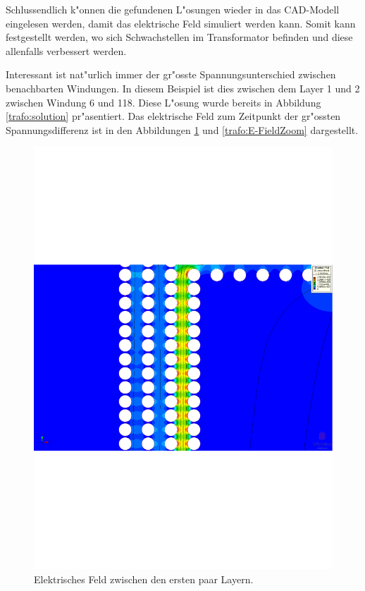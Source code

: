 \begin{refsection}
Schlussendlich k"onnen die gefundenen L"osungen wieder in das CAD-Modell eingelesen werden, damit das elektrische Feld simuliert werden kann. Somit kann festgestellt werden, wo sich Schwachstellen im Transformator befinden und diese allenfalls verbessert werden.

Interessant ist nat"urlich immer der gr"osste Spannungsunterschied zwischen benachbarten Windungen. In diesem Beispiel ist dies zwischen dem Layer 1 und 2 zwischen Windung 6 und 118.
Diese L"osung wurde bereits in Abbildung \ref{trafo:solution} pr"asentiert. Das elektrische Feld zum Zeitpunkt der gr"ossten Spannungsdifferenz ist in den Abbildungen \ref{trafo:E-Field} und \ref{trafo:E-FieldZoom} dargestellt. 

\begin{figure}
	\centering
	\includegraphics[width=\textwidth]{./trafo/images/BIL_VoltageTrans.pdf}
	\caption{Elektrisches Feld zwischen den ersten paar Layern.}
	\label{trafo:E-Field}
\end{figure}


\end{refsection}

